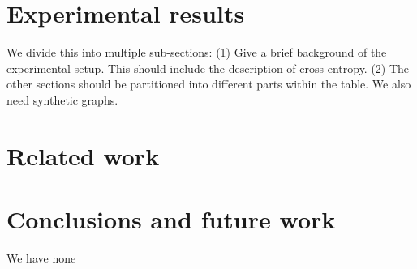 \documentclass[10pt]{article}
\begin{document}
\section{Experimental results}
\label{sec:experimental-results}

We divide this into multiple sub-sections: (1) Give a brief background
of the experimental setup. This should include the description of cross
entropy. (2) The other sections should be partitioned into different
parts within the table. We also need synthetic graphs.

\section{Related work}
\label{sec:related-work}



\section{Conclusions and future work}
\label{sec:concl-future-work}

We have none
\end{document}
